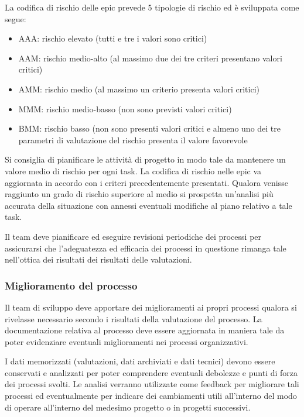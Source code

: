 La codifica di rischio delle epic prevede 5 tipologie di rischio ed è sviluppata come segue:
\begin{itemize}
    \item AAA: rischio elevato (tutti e tre i valori sono critici)
    \item AAM: rischio medio-alto (al massimo due dei tre criteri presentano valori critici)
    \item AMM: rischio medio (al massimo un criterio presenta valori critici)
    \item MMM: rischio medio-basso (non sono previsti valori critici)
    \item BMM: rischio basso (non sono presenti valori critici e almeno uno dei tre parametri di valutazione del rischio presenta il valore favorevole
\end{itemize}

Si consiglia di pianificare le attività di progetto in modo tale da mantenere un valore medio di rischio per ogni task. La codifica di rischio nelle epic va aggiornata in accordo con i criteri precedentemente presentati. Qualora venisse raggiunto un grado di rischio superiore al medio si prospetta un'analisi più accurata della situazione con annessi eventuali modifiche al piano relativo a tale task.

\myparagraph{}Il team deve pianificare ed eseguire revisioni periodiche dei processi per assicurarsi che l'adeguatezza ed efficacia dei processi in questione rimanga tale nell'ottica dei risultati dei risultati delle valutazioni.

\subsubsection{Miglioramento del processo}

\myparagraph{}Il team di sviluppo deve apportare dei miglioramenti ai propri processi qualora si rivelasse necessario secondo i risultati della valutazione del processo. La documentazione relativa al processo deve essere aggiornata in maniera tale da poter evidenziare eventuali miglioramenti nei processi organizzativi.

\myparagraph{}I dati memorizzati (valutazioni, dati archiviati e dati tecnici) devono essere conservati e analizzati per poter comprendere eventuali debolezze e punti di forza dei processi svolti. Le analisi verranno utilizzate come feedback per migliorare tali processi ed eventualmente per indicare dei cambiamenti utili all'interno del modo di operare all'interno del medesimo progetto o in progetti successivi.
